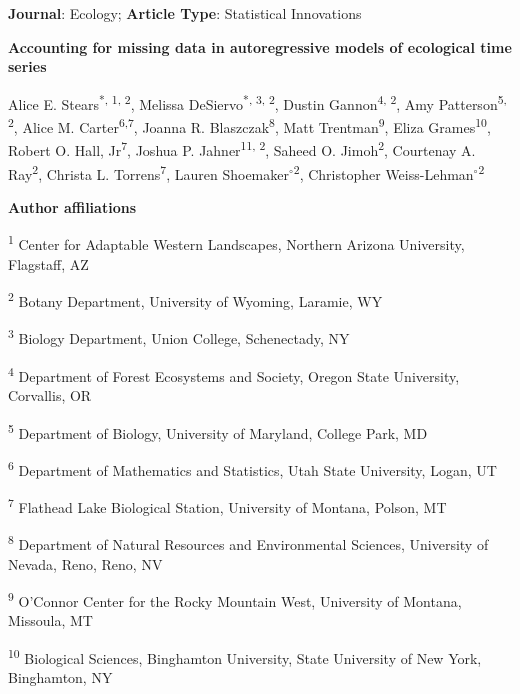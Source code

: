 \documentclass[12pt,english]{article} %
\begin{document}
\noindent\textbf{Journal}: Ecology; \textbf{Article Type}: Statistical Innovations

{\Large \noindent \bf %
Accounting for missing data in autoregressive models of ecological time series
}


\medskip

\noindent Alice E. Stears\textsuperscript{*, 1, 2}, 
Melissa DeSiervo\textsuperscript{*, 3, 2},
Dustin Gannon\textsuperscript{4, 2},
Amy Patterson\textsuperscript{5, 2},
Alice M. Carter\textsuperscript{6,7},
Joanna R. Blaszczak\textsuperscript{8},
Matt Trentman\textsuperscript{9},
Eliza Grames\textsuperscript{10},
Robert O. Hall, Jr\textsuperscript{7},
Joshua P. Jahner\textsuperscript{11, 2},
Saheed O. Jimoh\textsuperscript{2},
Courtenay A. Ray\textsuperscript{2},
Christa L. Torrens\textsuperscript{7},
Lauren Shoemaker$^{\circ}$\textsuperscript{2},
Christopher Weiss-Lehman$^{\circ}$\textsuperscript{2}

\noindent\noindent \textbf{Author affiliations}

\noindent\textsuperscript{1} Center for Adaptable Western Landscapes, Northern Arizona University, Flagstaff, AZ

\noindent\textsuperscript{2} Botany Department, University of Wyoming, Laramie, WY

\noindent\textsuperscript{3} Biology Department, Union College, Schenectady, NY

\noindent\textsuperscript{4} Department of Forest Ecosystems and Society, Oregon State University, Corvallis, OR 

\noindent\textsuperscript{5} Department of Biology, University of Maryland, College Park, MD

\noindent\textsuperscript{6} Department of Mathematics and Statistics, Utah State University, Logan, UT

\noindent\textsuperscript{7} Flathead Lake Biological Station, University of Montana, Polson, MT

\noindent\textsuperscript{8} Department of Natural Resources and Environmental Sciences, University of Nevada, Reno, Reno, NV

\noindent\textsuperscript{9} O’Connor Center for the Rocky Mountain West, University of Montana, Missoula, MT

\noindent\textsuperscript{10} Biological Sciences, Binghamton University, State University of New York, Binghamton, NY
\end{document}
